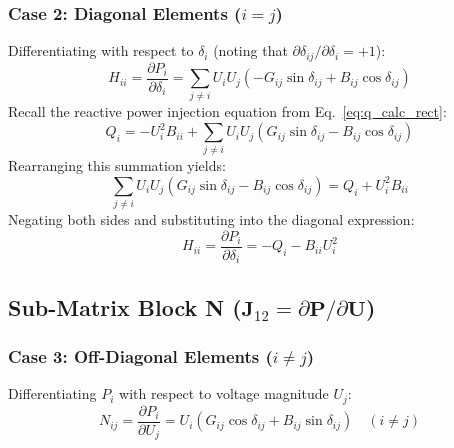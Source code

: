 \documentclass[12pt,a4paper,oneside]{report}
\begin{document}
\subsubsection{Case 2: Diagonal Elements ($i = j$)}
Differentiating with respect to $\delta_i$ (noting that $\partial \delta_{ij} / \partial \delta_i = +1$):
\begin{equation}
H_{ii} = \frac{\partial P_i}{\partial \delta_i} = \sum_{j \neq i} U_i U_j (-G_{ij} \sin\delta_{ij} + B_{ij} \cos\delta_{ij})
\end{equation}
Recall the reactive power injection equation from Eq.~\eqref{eq:q_calc_rect}:
\begin{equation}
Q_i = -U_i^2 B_{ii} + \sum_{j \neq i} U_i U_j (G_{ij} \sin\delta_{ij} - B_{ij} \cos\delta_{ij})
\end{equation}
Rearranging this summation yields:
\begin{equation}
\sum_{j \neq i} U_i U_j (G_{ij} \sin\delta_{ij} - B_{ij} \cos\delta_{ij}) = Q_i + U_i^2 B_{ii}
\end{equation}
Negating both sides and substituting into the diagonal expression:
\begin{equation}
H_{ii} = \frac{\partial P_i}{\partial \delta_i} = -Q_i - B_{ii} U_i^2
\end{equation}

\subsection{Sub-Matrix Block N ($\mathbf{J}_{12} = \partial \mathbf{P} / \partial \mathbf{U}$)}

\subsubsection{Case 3: Off-Diagonal Elements ($i \neq j$)}
Differentiating $P_i$ with respect to voltage magnitude $U_j$:
\begin{equation}
N_{ij} = \frac{\partial P_i}{\partial U_j} = U_i (G_{ij} \cos\delta_{ij} + B_{ij} \sin\delta_{ij}) \quad (i \neq j)
\end{equation}
\end{document}
